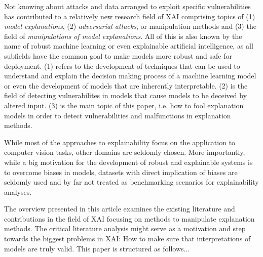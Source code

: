 Not knowing about attacks and data arranged to exploit specific vulnerabilities has contributed to a relatively new research field of XAI comprising topics of (1) \textit{model explanations}, (2) \textit{adversarial attacks}, or manipulation methods and (3) the field of \textit{manipulations of model explanations}. All of this is also known by the name of robust machine learning or even explainable artificial intelligence, as all subfields have the common goal to make models more robust and safe for deployment. 
(1) refers to the development of techniques that can be used to understand and explain the decision making process of a machine learning model or even the development of models that are inherently interpretable. (2) is the field of detecting vulnerabilites in models that cause models to be deceived by altered input. 
(3) is the main topic of this paper, i.e. how to fool explanation models in order to detect vulnerabilities and malfunctions in explanation methods. 


While most of the approaches to explainability focus on the application to computer vision tasks, other domains are seldomly chosen. 
More importantly, while a big motivation for the development of robust and explainable systems is to overcome biases in models, datasets with 
direct implication of biases are seldomly used and by far not treated as benchmarking scenarios for explainability analyses.  






The overview presented in this article examines the existing literature and contributions in the field of XAI focusing on methods to manipulate explanation methods.  
The critical literature analysis might serve as a motivation and step towards the biggest problems in XAI: How to make sure that interpretations of models are truly valid. 
This paper is structured as follows... 
